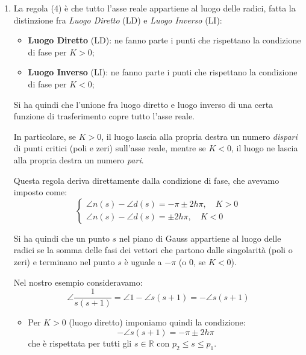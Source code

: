 \documentclass[a4paper,11pt]{article}
\begin{document}
\begin{enumerate}
	\item
		La regola (4) è che tutto l'asse reale appartiene al luogo delle radici, fatta la distinzione fra \textit{Luogo Diretto} (LD) e \textit{Luogo Inverso} (LI):
		\begin{itemize}
			\item \textbf{Luogo Diretto} (LD): ne fanno parte i punti che rispettano la condizione di fase per $K > 0$; 
			\item \textbf{Luogo Inverso} (LI): ne fanno parte i punti che rispettano la condizione di fase per $K < 0$; 
		\end{itemize}
		Si ha quindi che l'unione fra luogo diretto e luogo inverso di una certa funzione di trasferimento copre tutto l'asse reale.

		In particolare, se $K > 0$, il luogo lascia alla propria destra un numero \textit{dispari} di punti critici (poli e zeri) sull'asse reale, mentre se $K < 0$, il luogo ne lascia alla propria destra un numero \textit{pari}.

		Questa regola deriva direttamente dalla condizione di fase, che avevamo imposto come:
		\[
			\begin{cases}
				\angle n(s) - \angle d(s) = -\pi \pm 2 h \pi, \quad K > 0 \\
				\angle n(s) - \angle d(s) = \pm 2 h \pi, \quad K < 0
			\end{cases}
		\]

		Si ha quindi che un punto $s$ nel piano di Gauss appartiene al luogo delle radici se la somma delle fasi dei vettori che partono dalle singolarità (poli o zeri) e terminano nel punto $s$ è uguale a $-\pi$ (o 0, se $K < 0$).

		\par\medskip
		\noindent
		\textbf{}

		Nel nostro esempio consideravamo: 
		$$
		\angle \frac{1}{s(s + 1)} = \angle 1 - \angle s(s + 1) = -\angle s (s + 1)
		$$
		\begin{itemize}
			\item Per $K > 0$ (luogo diretto) imponiamo quindi la condizione:
				$$
				-\angle s (s + 1) = -\pi \pm 2 h \pi
				$$
				che è rispettata per tutti gli $s \in \mathbb{R}$ con $p_2  \leq s \leq p_1$.

				\newpage


\end{itemize}
\end{enumerate}
\end{document}
